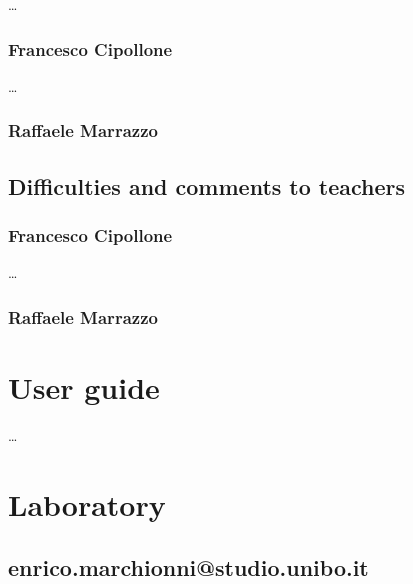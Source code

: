 \documentclass[12pt, a4paper]{report}
\begin{document}
    \dots

    \subsection*{Francesco Cipollone}

    \dots

    \subsection*{Raffaele Marrazzo}


\section{Difficulties and comments to teachers}

    \subsection*{Francesco Cipollone}

    \dots

    \subsection*{Raffaele Marrazzo}

    

\appendix

\chapter{User guide}

    \dots

\chapter{Laboratory}

\section{enrico.marchionni@studio.unibo.it}
\end{document}
